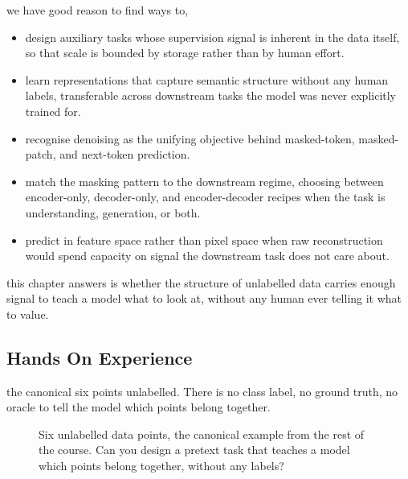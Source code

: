 we have good reason to find ways to,
\begin{itemize}
    \item design auxiliary tasks whose supervision signal is inherent in the data itself,
    so that scale is bounded by storage rather than by human effort.
    \item learn representations that capture semantic structure without any human labels,
    transferable across downstream tasks the model was never explicitly trained for.
    \item recognise denoising as the unifying objective behind masked-token, masked-patch,
    and next-token prediction.
    \item match the masking pattern to the downstream regime, choosing between encoder-only,
    decoder-only, and encoder-decoder recipes when the task is understanding, generation, or both.
    \item predict in feature space rather than pixel space when raw reconstruction would
    spend capacity on signal the downstream task does not care about.
\end{itemize}

 this chapter answers is whether the structure of unlabelled data
carries enough signal to teach a model what to look at,
without any human ever telling it what to value.





\newpage
\iffalse
\subsection{Hands On Experience}

 the canonical six points unlabelled.
There is no class label, no ground truth, no oracle to tell the model which points belong together.

\begin{figure}
\centering
{}
\caption{Six unlabelled data points, the canonical example from the rest of the course. Can you design a pretext task that teaches a model which points belong together, without any labels?}
\label{fig:ssl_handson}
\end{figure}


